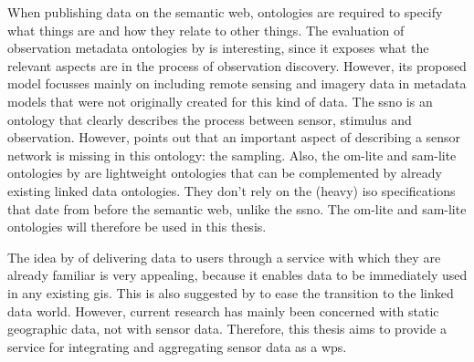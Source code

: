 When publishing data on the semantic web, ontologies are required to specify what things are and how they relate to other things. The evaluation of observation metadata ontologies by \cite{SW:Hu} is interesting, since it exposes what the relevant aspects are in the process of observation discovery. However, its proposed model focusses mainly on including remote sensing and imagery data in metadata models that were not originally created for this kind of data. The \ac{ssno} is an ontology that clearly describes the process between sensor, stimulus and observation. However, \cite{SSW:Cox4} points out that an important aspect of describing a sensor network is missing in this ontology: the sampling. Also, the om-lite and sam-lite ontologies by \cite{SSW:Cox4} are lightweight ontologies that can be complemented by already existing linked data ontologies. They don't rely on the (heavy) \ac{iso} specifications that date from before the semantic web, unlike the \ac{ssno}. The om-lite and sam-lite ontologies will therefore be used in this thesis.  

The idea by \cite{SW:Jones} of delivering data to users through a service with which they are already familiar is very appealing, because it enables data to be immediately used in any existing \ac{gis}. This is also suggested by \cite{SSW:Atkinson} to ease the transition to the linked data world. However, current research has mainly been concerned with static geographic data, not with sensor data. Therefore, this thesis aims to provide a service for integrating and aggregating sensor data as a \ac{wps}.
